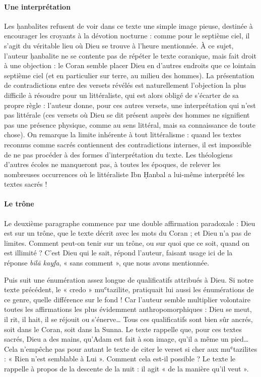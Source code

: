 \begin{figure}[h!]
\end{figure}

\paragraph{Une interprétation} Les ḥanbalites
refusent de voir dans ce texte une simple image pieuse, destinée à
encourager les croyants à la dévotion nocturne : comme pour le septième
ciel, il s'agit du véritable lieu où Dieu se trouve à l'heure
mentionnée. À ce sujet, l'auteur ḥanbalite ne se contente pas de répéter
le texte coranique, mais fait droit à une objection : le Coran semble
placer Dieu en d'autres endroits que ce lointain septième ciel (et en
particulier sur terre, au milieu des hommes). La présentation de
contradictions entre des versets révélés est naturellement l'objection
la plus difficile à résoudre pour un littéraliste, qui est alors obligé
de s'écarter de sa propre règle : l'auteur donne, pour ces autres
versets, une interprétation qui n'est pas littérale (ces versets où Dieu
se dit présent auprès des hommes ne signifient pas une présence
physique, comme au sens littéral, mais sa connaissance de toute chose).
On remarque la limite inhérente à tout littéralisme : quand les textes
reconnus comme sacrés contiennent des contradictions internes, il est
impossible de
ne pas procéder à des formes d'interprétation du texte. Les théologiens
d'autres écoles ne manqueront pas, à toutes les époques, de relever les
nombreuses occurrences où le littéraliste Ibn Ḥanbal a lui-même
interprété les textes sacrés !

\paragraph{Le trône}Le deuxième paragraphe commence par une double affirmation paradoxale :
Dieu est sur un trône, que le texte décrit avec les mots du Coran ; et
Dieu n'a pas de limites. Comment peut-on tenir sur un trône, ou sur quoi
que ce soit, quand on est illimité ? C'est Dieu qui le sait, répond
l'auteur, faisant usage ici de la réponse \emph{bilā kayfa}, « sans
comment », que nous avons mentionnée.

Puis suit une énumération assez longue de qualificatifs attribués à
Dieu. Si notre texte précédent, le « credo » muʿtazilite, pratiquait lui
aussi les énumérations de ce genre, quelle différence sur le fond ! Car
l'auteur semble multiplier volontaire toutes les affirmations les plus
évidemment anthropomorphiques : Dieu se meut, il rit, il hait, il se
réjouit ou s'énerve\ldots{} Tous ces qualificatifs sont bien sûr ancrés,
soit dans le Coran, soit dans la Sunna. Le texte rappelle que, pour ces
textes sacrés, Dieu a des mains, qu'Adam est fait à son image, qu'il a
même un pied\ldots{} Cela n'empêche pas pour autant le texte de citer le
verset si cher aux muʿtazilites : « Rien n'est semblable à Lui ».
Comment cela est-il possible ? Le texte le rappelle à propos de la
descente de la nuit : il agit « de la manière qu'il veut ».

